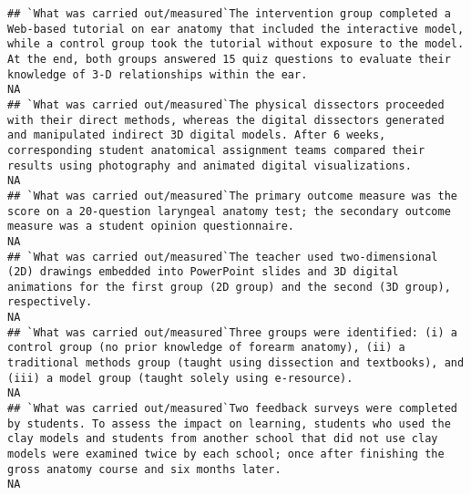 \documentclass[]{article}
\begin{document}
\begin{verbatim}
## `What was carried out/measured`The intervention group completed a Web-based tutorial on ear anatomy that included the interactive model, while a control group took the tutorial without exposure to the model. At the end, both groups answered 15 quiz questions to evaluate their knowledge of 3-D relationships within the ear.                                                                                                                                                     NA
## `What was carried out/measured`The physical dissectors proceeded with their direct methods, whereas the digital dissectors generated and manipulated indirect 3D digital models. After 6 weeks, corresponding student anatomical assignment teams compared their results using photography and animated digital visualizations.                                                                                                                                                         NA
## `What was carried out/measured`The primary outcome measure was the score on a 20-question laryngeal anatomy test; the secondary outcome measure was a student opinion questionnaire.                                                                                                                                                                                                                                                                                                    NA
## `What was carried out/measured`The teacher used two-dimensional (2D) drawings embedded into PowerPoint slides and 3D digital animations for the first group (2D group) and the second (3D group), respectively.                                                                                                                                                                                                                                                                         NA
## `What was carried out/measured`Three groups were identified: (i) a control group (no prior knowledge of forearm anatomy), (ii) a traditional methods group (taught using dissection and textbooks), and (iii) a model group (taught solely using e-resource).                                                                                                                                                                                                                           NA
## `What was carried out/measured`Two feedback surveys were completed by students. To assess the impact on learning, students who used the clay models and students from another school that did not use clay models were examined twice by each school; once after finishing the gross anatomy course and six months later.                                                                                                                                                               NA

\end{verbatim}
\end{document}
